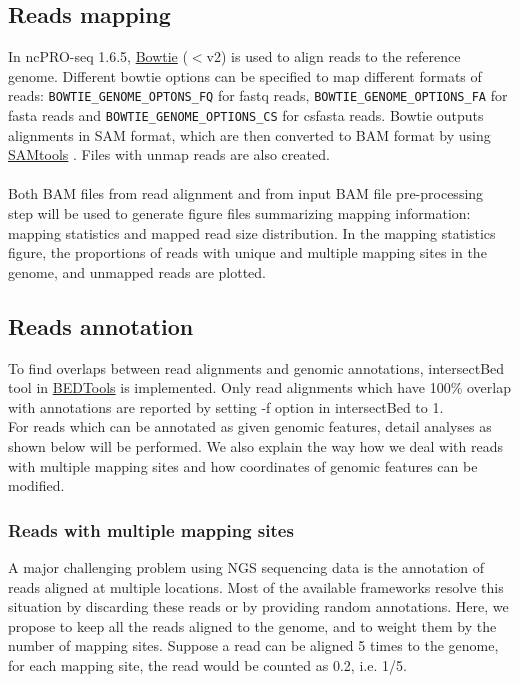 \documentclass[12pt]{article}
\def \ncpip{ncPRO-seq 1.6.5}
\begin{document}
\subsection{Reads mapping}
In \ncpip{}, \href{http://bowtie-bio.sourceforge.net/index.shtml}{ Bowtie} ($<$v2) \cite{Langmead2009} is used to align reads to the reference genome. Different bowtie options can be specified to map different formats of reads: \verb+BOWTIE_GENOME_OPTONS_FQ+ for fastq reads, \verb+BOWTIE_GENOME_OPTIONS_FA+ for fasta reads and \verb+BOWTIE_GENOME_OPTIONS_CS+ for csfasta reads. Bowtie outputs alignments in SAM format, which are then converted to BAM format by using \href{http://samtools.sourceforge.net/}{ SAMtools} \cite{Li2009}. Files with unmap reads are also created. \\\\
Both BAM files from read alignment and from input BAM file pre-processing step will be used to generate figure files summarizing mapping information: mapping statistics and mapped read size distribution. In the mapping statistics figure, the proportions of reads with unique and multiple mapping sites in the genome, and unmapped reads are plotted. 

\subsection{Reads annotation}
To find overlaps between read alignments and genomic annotations, intersectBed tool in \href{http://code.google.com/p/bedtools/}{ BEDTools} \cite{Quinlan2010} is implemented. Only read alignments which have 100\% overlap with annotations are reported by setting -f option in intersectBed to 1. \\For reads which can be annotated as given genomic features, detail analyses as shown below will be performed. We also explain the way how we deal with reads with multiple mapping sites and how coordinates of genomic features can be modified.

\subsubsection{Reads with multiple mapping sites}
A major challenging problem using NGS sequencing data is the annotation of reads aligned at multiple locations. Most of the available frameworks resolve this situation by discarding these reads or by providing random annotations. Here, we propose to keep all the reads aligned to the genome, and to weight them by the number of mapping sites. Suppose a read can be aligned 5 times to the genome, for each mapping site, the read would be counted as 0.2, i.e. 1/5.
\end{document}
